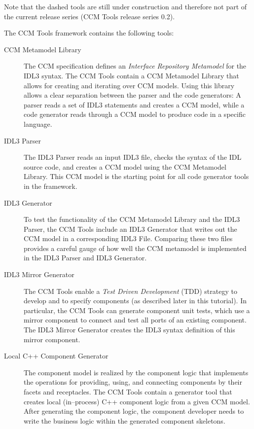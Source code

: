 Note that the dashed tools are still under construction and therefore not part
of the current release series (CCM Tools release series 0.2).

The CCM Tools framework contains the following tools:

\begin{description}
\item [CCM Metamodel Library]
The CCM specification defines an {\it Interface Repository Metamodel} for the
IDL3 syntax. The CCM Tools contain a CCM Metamodel Library that allows for
creating and iterating over CCM models. Using this library allows a clear
separation between the parser and the code generators: A parser reads a set of
IDL3 statements and creates a CCM model, while a code generator reads through a
CCM model to produce code in a specific language.

\item [IDL3 Parser]
The IDL3 Parser reads an input IDL3 file, checks the syntax of the IDL source
code, and creates a CCM model using the CCM Metamodel Library. This CCM model is
the starting point for all code generator tools in the framework.

\item [IDL3 Generator]
To test the functionality of the CCM Metamodel Library and the IDL3 Parser, the
CCM Tools include an IDL3 Generator that writes out the CCM model in a
corresponding IDL3 File. Comparing these two files provides a careful gauge of
how well the CCM metamodel is implemented in the IDL3 Parser and IDL3 Generator.

\item [IDL3 Mirror Generator]
The CCM Tools enable a {\it Test Driven Development} (TDD) strategy to develop
and to specify components (as described later in this tutorial). In particular,
the CCM Tools can generate component unit tests, which use a mirror component to
connect and test all ports of an existing component. The IDL3 Mirror Generator
creates the IDL3 syntax definition of this mirror component.

\item [Local C++ Component Generator]
The component model is realized by the component logic that implements the
operations for providing, using, and connecting components by their facets and
receptacles. The CCM Tools contain a generator tool that creates local
(in--process) C++ component logic from a given CCM model. After generating the
component logic, the component developer needs to write the business logic
within the generated component skeletons.


\end{description}
